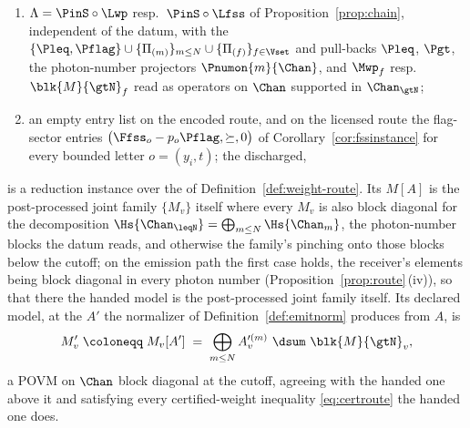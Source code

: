 \begin{proposition}
\begin{enumerate}[label=(I\arabic*),leftmargin=3.0em]
\item $\Lambda=\PinS\circ\Lwp$ resp.\ $\PinS\circ\Lfss$ of
  Proposition~\ref{prop:chain}, independent of the datum, with the
   $\{\Pleq,\Pflag\}\cup\{\Pi_{(m)}\}_{m\le N}\cup
  \{\Pi_{(f)}\}_{f\in\Vset}$ and pull-backs $\Pleq$, $\Pgt$, the
  photon-number projectors $\Pnumon{m}{\Chan}$, and $\Mwp_f$ resp.\
  $\blk{M}{\gtN}_f$ read as operators on $\Chan$ supported in $\Chan_{\gtN}$;
\item an empty entry list on the encoded route, and on the
  licensed route the flag-sector entries
  $\big(\Ffss_o-p_o\Pflag,\succeq,0\big)$ of Corollary~\ref{cor:fssinstance}
  for every bounded letter $o=(y_i,t)$; the \tref{class-marginal identity}
  discharged,
\end{enumerate}
is a reduction instance over the  of
Definition~\ref{def:weight-route}. Its  $M[A]$ is the
post-processed joint family $\{M_v\}$ itself where every $M_v$ is also block
diagonal for the decomposition
$\Hs{\Chan_{\leqN}}=\bigoplus_{m\le N}\Hs{\Chan_m}$, the photon-number blocks
the datum reads, and otherwise the family's pinching onto those blocks below
the cutoff; on the emission path the first case holds, the receiver's
elements being block diagonal in every photon number
(Proposition~\ref{prop:route}\,(iv)), so that there the handed model is the
post-processed joint family itself. Its declared model, at the
 $A'$ the normalizer of
Definition~\ref{def:emitnorm} produces from $A$, is
\begin{equation}\label{eq:flat-declared}
  M'_v\;\coloneqq\;M_v[A']\;=\;\bigoplus_{m\le N}A'^{(m)}_v\ \dsum\ \blk{M}{\gtN}_v ,
\end{equation}
a POVM on $\Chan$ block diagonal at the cutoff, agreeing with the handed one
above it and satisfying every certified-weight inequality \eqref{eq:certroute}
the handed one does.
\end{proposition}


